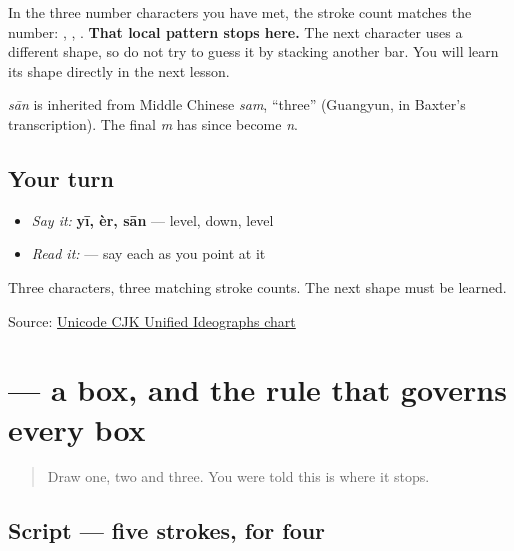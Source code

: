 \begin{culture}
In the three number characters you have met, the stroke count matches the number: , , . \textbf{That local pattern stops here.} The next character uses a different shape, so do not try to guess it by stacking another bar. You will learn its shape directly in the next lesson.
\end{culture}

\begin{cousinweb}
\textbf{} \emph{sān} is inherited from Middle Chinese \emph{sam}, \textquotedblleft{}three\textquotedblright{} (Guangyun, in Baxter's transcription). The final \emph{m} has since become \emph{n}.
\end{cousinweb}

\subsection*{Your turn}
\begin{itemize}
\raggedright
  \item \emph{Say it:} \textbf{yī, èr, sān} — level, down, level
  \item \emph{Read it:}    — say each as you point at it
\end{itemize}

\begin{tcolorbox}[breakable,colback=teal!4,colframe=teal!35!black,title={Before you move on}]
Three characters, three matching stroke counts. The next shape must be learned.

Source: \href{https://www.unicode.org/charts/PDF/U4E00.pdf}{Unicode CJK Unified Ideographs chart}
\end{tcolorbox}
\section[\texorpdfstring{\zh{四} (sì)}{四 (sì)}]{ — a box, and the rule that governs every box}

\label{lesson:ZH-W03-si}



\begin{quote}
Draw one, two and three. You were told this is where it stops.
\end{quote}

\subsection*{Script — five strokes, for four}

